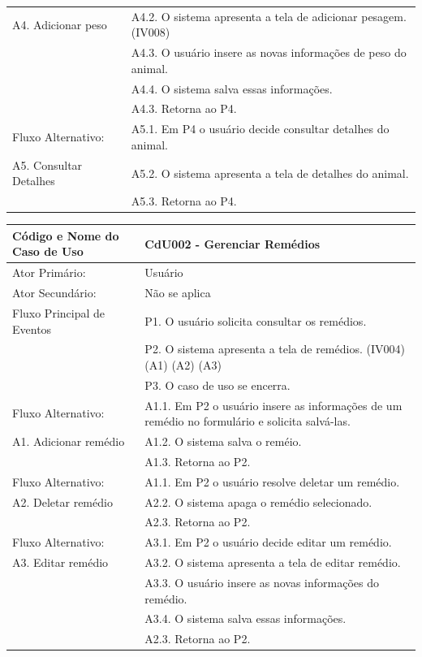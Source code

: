 \documentclass[12pt]{article}
\begin{document}
\begin{titlepage}
\begin{center}
\begin{tabular}{ | l |  p{10cm} |}
    A4. Adicionar peso         & A4.2. O sistema apresenta a tela de adicionar pesagem. (IV008) \\
			       & A4.3. O usuário insere as novas informações de peso do animal. \\
                               & A4.4. O sistema salva essas informações. \\
			       & A4.3. Retorna ao P4. \\ \hline
    Fluxo Alternativo:         & A5.1. Em P4 o usuário decide consultar detalhes do animal. \\
    A5. Consultar Detalhes     & A5.2. O sistema apresenta a tela de detalhes do animal. \\
			       & A5.3. Retorna ao P4. \\
    \hline
  \end{tabular}
\end{center}


\begin{center}
  \begin{tabular}{ | l |  p{10cm} |}
    \hline
    Código e Nome do Caso de Uso & CdU002 - Gerenciar Remédios \\ \hline
    Ator Primário: & Usuário \\ 
    Ator Secundário: & Não se aplica \\ \hline
    Fluxo Principal de Eventos & P1. O usuário solicita consultar os remédios. \\
			       & P2. O sistema apresenta a tela de remédios. (IV004) (A1) (A2) (A3) \\
                               & P3. O caso de uso se encerra. \\ \hline
    Fluxo Alternativo:         & A1.1. Em P2 o usuário insere as informações de um remédio no formulário e solicita salvá-las. \\
    A1. Adicionar remédio      & A1.2. O sistema salva o reméio. \\ 
			       & A1.3. Retorna ao P2. \\ \hline
    Fluxo Alternativo:         & A1.1. Em P2 o usuário resolve deletar um remédio. \\
    A2. Deletar remédio        & A2.2. O sistema apaga o remédio selecionado. \\
			       & A2.3. Retorna ao P2. \\ \hline
    Fluxo Alternativo:         & A3.1. Em P2 o usuário decide editar um remédio. \\
    A3. Editar remédio         & A3.2. O sistema apresenta a tela de editar remédio. \\
			       & A3.3. O usuário insere as novas informações do remédio. \\
                               & A3.4. O sistema salva essas informações. \\
			       & A2.3. Retorna ao P2. \\
    \hline
  \end{tabular}
\end{center}



\end{titlepage}
\end{document}
